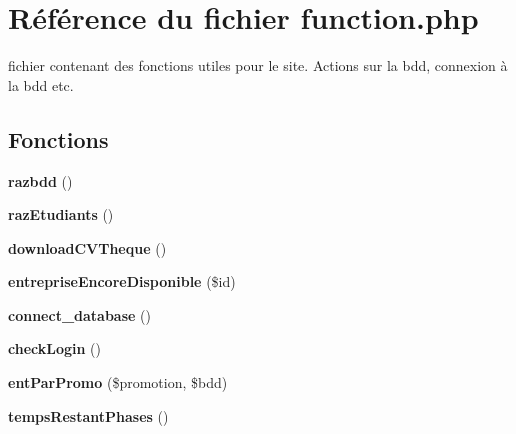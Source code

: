 \hypertarget{function_8php}{\section{Référence du fichier function.\-php}
\label{function_8php}
}


fichier contenant des fonctions utiles pour le site. Actions sur la bdd, connexion à la bdd etc.  


\subsection*{Fonctions}
\begin{DoxyCompactItemize}
\item 
\hypertarget{function_8php_a03c93c7f5fb072f73ce3708919a866a8}{{\bfseries razbdd} ()}\label{function_8php_a03c93c7f5fb072f73ce3708919a866a8}

\item 
\hypertarget{function_8php_a7d4f9fc4bec979b07f55f932d37d54a8}{{\bfseries raz\-Etudiants} ()}\label{function_8php_a7d4f9fc4bec979b07f55f932d37d54a8}

\item 
\hypertarget{function_8php_a84f5d05a79bfe6359f8567c9e758131d}{{\bfseries download\-C\-V\-Theque} ()}\label{function_8php_a84f5d05a79bfe6359f8567c9e758131d}

\item 
\hypertarget{function_8php_afedf546732a97f1d7f7b051519ecdb6b}{{\bfseries entreprise\-Encore\-Disponible} (\$id)}\label{function_8php_afedf546732a97f1d7f7b051519ecdb6b}

\item 
\hypertarget{function_8php_a1f56f7efe8c1222675d8715c259957d5}{{\bfseries connect\-\_\-database} ()}\label{function_8php_a1f56f7efe8c1222675d8715c259957d5}

\item 
\hypertarget{function_8php_ab8e90adf3e4b15eea283c4ea450a4288}{{\bfseries check\-Login} ()}\label{function_8php_ab8e90adf3e4b15eea283c4ea450a4288}

\item 
\hypertarget{function_8php_aa9bba2e669d4e2612a16cf05b84ff3e6}{{\bfseries ent\-Par\-Promo} (\$promotion, \$bdd)}\label{function_8php_aa9bba2e669d4e2612a16cf05b84ff3e6}

\item 
\hypertarget{function_8php_ad6f79d8c143ad0f2e5ad98b72dc704c6}{{\bfseries temps\-Restant\-Phases} ()}\label{function_8php_ad6f79d8c143ad0f2e5ad98b72dc704c6}


\end{DoxyCompactItemize}
